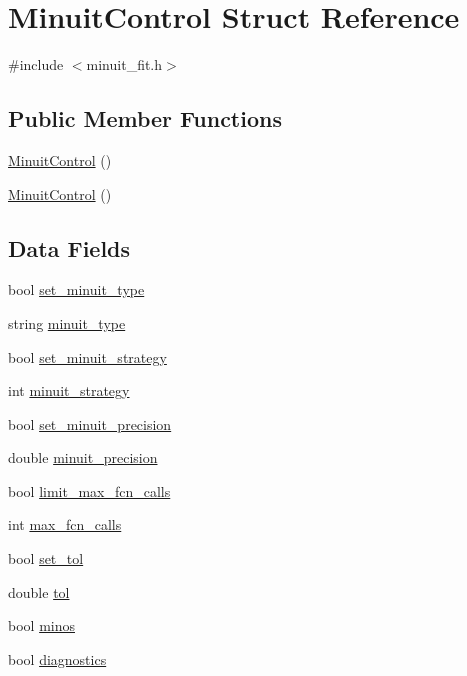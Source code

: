 \hypertarget{structMinuitControl}{}\section{Minuit\+Control Struct Reference}
\label{structMinuitControl}


{\ttfamily \#include $<$minuit\+\_\+fit.\+h$>$}

\subsection*{Public Member Functions}
\begin{DoxyCompactItemize}
\item 
\mbox{\hyperlink{structMinuitControl_a079eb2b902c2e9b607b388ec5dba1b35}{Minuit\+Control}} ()
\item 
\mbox{\hyperlink{structMinuitControl_a079eb2b902c2e9b607b388ec5dba1b35}{Minuit\+Control}} ()
\end{DoxyCompactItemize}
\subsection*{Data Fields}
\begin{DoxyCompactItemize}
\item 
bool \mbox{\hyperlink{structMinuitControl_a2b62f58d8f2dc4c36a92b7cb64f184c4}{set\+\_\+minuit\+\_\+type}}
\item 
string \mbox{\hyperlink{structMinuitControl_a4b31f74749c08c49de4ca38c329a0400}{minuit\+\_\+type}}
\item 
bool \mbox{\hyperlink{structMinuitControl_ab675de13518ca84732c701ca0a069487}{set\+\_\+minuit\+\_\+strategy}}
\item 
int \mbox{\hyperlink{structMinuitControl_a81cded4678738588f5616d552141d58e}{minuit\+\_\+strategy}}
\item 
bool \mbox{\hyperlink{structMinuitControl_ac06018b0255295e25161a79ce8bf7724}{set\+\_\+minuit\+\_\+precision}}
\item 
double \mbox{\hyperlink{structMinuitControl_a9466d8961262451ff1521ce397ee6f72}{minuit\+\_\+precision}}
\item 
bool \mbox{\hyperlink{structMinuitControl_ab4b260696a2246e4c5a5ff99ca4a48b2}{limit\+\_\+max\+\_\+fcn\+\_\+calls}}
\item 
int \mbox{\hyperlink{structMinuitControl_abb2461c83637f010756013a545a1bd0f}{max\+\_\+fcn\+\_\+calls}}
\item 
bool \mbox{\hyperlink{structMinuitControl_a7270f6be2535a86090d41cb1bbcc0640}{set\+\_\+tol}}
\item 
double \mbox{\hyperlink{structMinuitControl_a796723b11058849217e25bac3937f34d}{tol}}
\item 
bool \mbox{\hyperlink{structMinuitControl_a29b21b09367292bd47e6384a1f71b684}{minos}}
\item 
bool \mbox{\hyperlink{structMinuitControl_a301338f3d2afc00ab6b6d016b1471381}{diagnostics}}
\end{DoxyCompactItemize}


